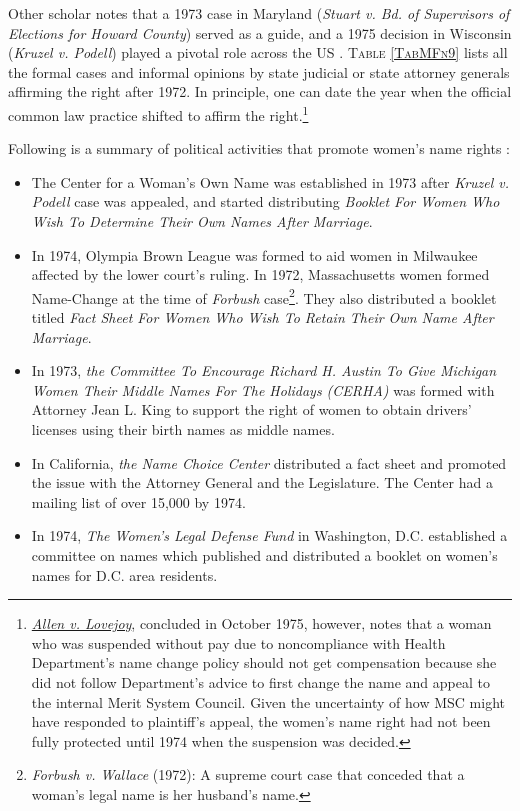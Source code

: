 Other scholar notes that a 1973 case in Maryland (\textit{Stuart v. Bd. of Supervisors of Elections for Howard County}) served as a guide, and a 1975 decision in Wisconsin (\textit{Kruzel v. Podell}) played a pivotal role across the US \citep[][fn 4]{MacDougall1985}. \textsc{Table \ref{TabMFn9}} lists all the formal cases and informal opinions by state judicial or state attorney generals affirming the right after 1972. In principle, one can date the year when the official common law practice shifted to affirm the right.\footnote{\href{https://law.justia.com/cases/federal/district-courts/FSupp/406/359/2143469/}{\textit{Allen v. Lovejoy}}, concluded in October 1975, however, notes that a woman who was suspended without pay due to noncompliance with Health Department's name change policy should not get compensation because she did not follow Department's advice to first change the name and appeal to the internal Merit System Council. Given the uncertainty of how MSC might have responded to plaintiff's appeal, the women's name right had not been fully protected until 1974 when the suspension was decided. } 


Following is a summary of political activities that promote women's name rights \citep[][fn 5]{MacDougall1985}: 
\begin{itemize}
\vspace{1.0ex}\setlength{\itemsep}{1.0ex}\setlength{\baselineskip}{12pt}
\item	The Center for a Woman's Own Name was established in 1973 after \textit{Kruzel v. Podell} case was appealed, and started distributing \textit{Booklet For Women Who Wish To Determine Their Own Names After Marriage}. 
\item	In 1974, Olympia Brown League was formed to aid women in Milwaukee affected by the lower court's ruling. In 1972, Massachusetts women formed Name-Change at the time of \textit{Forbush} case\footnote{\textit{Forbush v. Wallace} (1972): A supreme court case that conceded that a woman's legal name is her husband's name. }. They also distributed a booklet titled \textit{Fact Sheet For Women Who Wish To Retain Their Own Name After Marriage}. 
\item	In 1973, \textit{the Committee To Encourage Richard H. Austin To Give Michigan Women Their Middle Names For The Holidays (CERHA)} was formed with Attorney Jean L. King to support the right of women to obtain drivers' licenses using their birth names as middle names. 
\item	In California, \textit{the Name Choice Center} distributed a fact sheet and promoted the issue with the Attorney General and the Legislature. The Center had a mailing list of over 15,000 by 1974. 
\item	In 1974, \textit{The Women's Legal Defense Fund} in Washington, D.C. established a committee
on names which published and distributed a booklet on women's names for D.C. area residents. 
\end{itemize}



